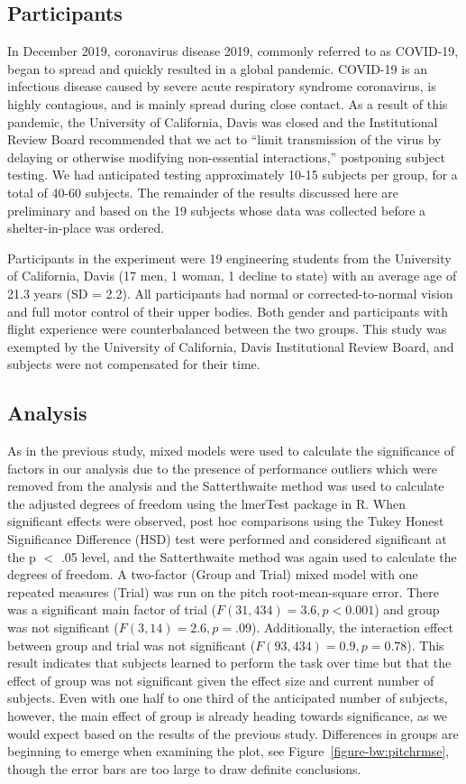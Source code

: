 \subsection{Participants}
In December 2019, coronavirus disease 2019, commonly referred to as COVID-19, began to spread and quickly resulted in a global pandemic.
COVID-19 is an infectious disease caused by severe acute respiratory syndrome coronavirus, is highly contagious, and is mainly spread during close contact.
As a result of this pandemic, the University of California, Davis was closed and the Institutional Review Board recommended that we act to ``limit transmission of the virus by delaying or otherwise modifying non-essential interactions,'' postponing subject testing.
We had anticipated testing approximately 10-15 subjects per group, for a total of 40-60 subjects.
The remainder of the results discussed here are preliminary and based on the 19 subjects whose data was collected before a shelter-in-place was ordered.

Participants in the experiment were 19 engineering students from the University of California, Davis (17 men, 1 woman, 1 decline to state) with an average age of 21.3 years (SD = 2.2).
All participants had normal or corrected-to-normal vision and full motor control of their upper bodies.
Both gender and participants with flight experience were counterbalanced between the two groups.
This study was exempted by the University of California, Davis Institutional Review Board, and subjects were not compensated for their time.

\subsection{Analysis}

As in the previous study, mixed models were used to calculate the significance of factors in our analysis due to the presence of performance outliers which were removed from the analysis and the Satterthwaite method was used to calculate the adjusted degrees of freedom using the lmerTest package in R.
When significant effects were observed, post hoc comparisons using the Tukey Honest Significance Difference (HSD) test were performed and considered significant at the p $<$ .05 level, and the Satterthwaite method was again used to calculate the degrees of freedom.
A two-factor (Group and Trial) mixed model with one repeated measures (Trial) was run on the pitch root-mean-square error.
There was a significant main factor of trial ($F(31, 434) = 3.6, p < 0.001$) and group was not significant ($F(3, 14) = 2.6, p = .09$).
Additionally, the interaction effect between group and trial was not significant ($F(93, 434) = 0.9, p = 0.78$).
This result indicates that subjects learned to perform the task over time but that the effect of group was not significant given the effect size and current number of subjects.
Even with one half to one third of the anticipated number of subjects, however, the main effect of group is already heading towards significance, as we would expect based on the results of the previous study.
Differences in groups are beginning to emerge when examining the plot, see Figure~\ref{figure-bw:pitchrmse}, though the error bars are too large to draw definite conclusions.

